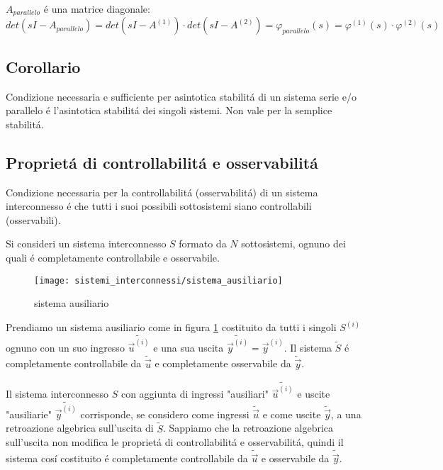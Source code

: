 \documentclass[../main.tex]{subfiles}
\begin{document}
			$ A_{parallelo} $ \'e una matrice diagonale:
			\[
				det(sI-A_{parallelo}) = det(sI-A^{(1)}) \cdot det(sI-A^{(2)}) = \varphi_{parallelo}(s) = \varphi^{(1)}(s) \cdot \varphi^{(2)}(s)
			\]
	\subsection{Corollario}
		Condizione necessaria e sufficiente per asintotica stabilit\'a di un sistema serie e/o parallelo \'e l'asintotica stabilit\'a dei singoli sistemi. Non vale per la semplice stabilit\'a.
		
	\subsection{Propriet\'a di controllabilit\'a e osservabilit\'a}
		Condizione necessaria per la controllabilit\'a (osservabilit\'a) di un sistema interconnesso \'e che tutti i suoi possibili sottosistemi siano controllabili (osservabili).
		
		Si consideri un sistema interconnesso $ S $ formato da $ N $ sottosistemi, ognuno dei quali \'e completamente controllabile e osservabile.
		
		\begin{figure}[h!]
			\centering\texttt{[image: sistemi\_interconnessi/sistema\_ausiliario]}
			\caption{sistema ausiliario}
			\label{fig:sistema_ausiliario}
		\end{figure}
		Prendiamo un sistema ausiliario come in figura \ref{fig:sistema_ausiliario} costituito da tutti i singoli $ S^{(i)} $ ognuno con un suo ingresso $ \tilde{\vec u^{(i)}} $ e una sua uscita $ \tilde{\vec y^{(i)}} = \vec{y}^{(i)} $. Il sistema $ \tilde S $ \'e completamente controllabile da $ \tilde{\vec u} $ e completamente osservabile da $ \tilde{\vec y} $.
		
		Il sistema interconnesso $ S $ con aggiunta di ingressi "ausiliari" $ \tilde{\vec u^{(i)}} $ e uscite "ausiliarie" $ \tilde{\vec y^{(i)}} $ corrisponde, se considero come ingressi $ \tilde{\vec u} $ e come uscite $ \tilde{\vec y} $, a una retroazione algebrica sull'uscita di $ \tilde S $. Sappiamo che la retroazione algebrica sull'uscita non modifica le propriet\'a di controllabilit\'a e osservabilit\'a, quindi il sistema cos\'i costituito \'e completamente controllabile da $ \tilde{\vec u} $ e osservabile da $ \tilde{\vec y} $.
		
\end{document}
